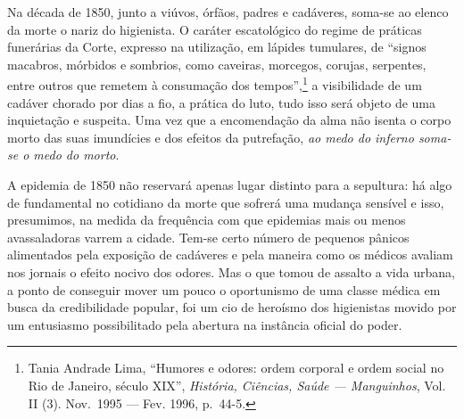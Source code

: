 Na década de 1850, junto a viúvos, órfãos, padres e cadáveres, soma-se
ao elenco da morte o nariz do higienista. O caráter escatológico do
regime de práticas funerárias da Corte, expresso na utilização, em
lápides tumulares, de ``signos macabros, mórbidos e sombrios, como
caveiras, morcegos, corujas, serpentes, entre outros que remetem à
consumação dos tempos'',\footnote{Tania Andrade Lima, ``Humores e
  odores: ordem corporal e ordem social no Rio de Janeiro, século XIX'',
  \textit{História, Ciências, Saúde --- Manguinhos}, Vol. II (3). Nov.~1995
  --- Fev. 1996, p.~44-5.} a visibilidade de um cadáver chorado por dias
a fio, a prática do luto, tudo isso será objeto de uma inquietação e
suspeita. Uma vez que a encomendação da alma não isenta o corpo morto
das suas imundícies e dos efeitos da putrefação, \textit{ao medo do
inferno soma-se o medo do morto}.

A epidemia de 1850 não reservará apenas lugar distinto para a sepultura:
há algo de fundamental no cotidiano da morte que sofrerá uma mudança
sensível e isso, presumimos, na medida da frequência com que epidemias
mais ou menos avassaladoras varrem a cidade. Tem-se certo número de
pequenos pânicos alimentados pela exposição de cadáveres e pela maneira
como os médicos avaliam nos jornais o efeito nocivo dos odores. Mas o
que tomou de assalto a vida urbana, a ponto de conseguir mover um pouco
o oportunismo de uma classe médica em busca da credibilidade popular,
foi um cio de heroísmo dos higienistas movido por um entusiasmo
possibilitado pela abertura na instância oficial do poder.

